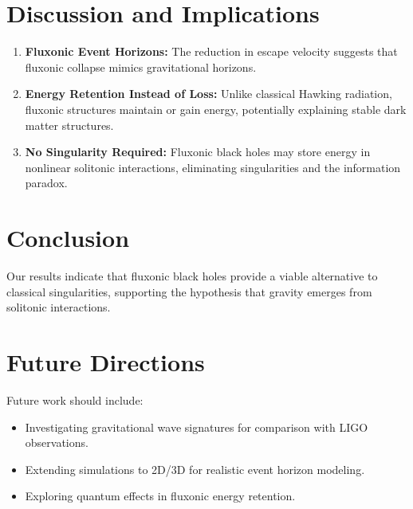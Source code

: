 \documentclass{article}
\begin{document}
\section{Discussion and Implications}
\begin{enumerate}
    \item \textbf{Fluxonic Event Horizons:} The reduction in escape velocity suggests that fluxonic collapse mimics gravitational horizons.
    \item \textbf{Energy Retention Instead of Loss:} Unlike classical Hawking radiation, fluxonic structures maintain or gain energy, potentially explaining stable dark matter structures.
    \item \textbf{No Singularity Required:} Fluxonic black holes may store energy in nonlinear solitonic interactions, eliminating singularities and the information paradox.
\end{enumerate}

\section{Conclusion}
Our results indicate that fluxonic black holes provide a viable alternative to classical singularities, supporting the hypothesis that gravity emerges from solitonic interactions.

\section{Future Directions}
Future work should include:
\begin{itemize}
    \item Investigating gravitational wave signatures for comparison with LIGO observations.
    \item Extending simulations to 2D/3D for realistic event horizon modeling.
    \item Exploring quantum effects in fluxonic energy retention.
\end{itemize}
\end{document}
